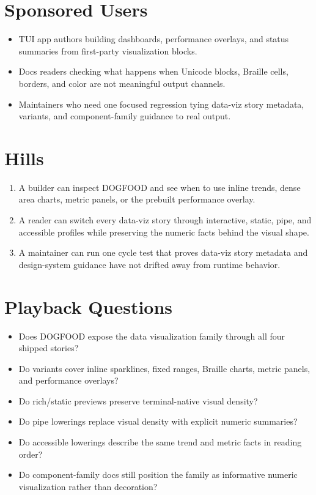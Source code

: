 \section{Sponsored Users}\label{record-107-sponsored-users}

\begin{itemize}
\tightlist
\item
  TUI app authors building dashboards, performance overlays, and status summaries from first-party visualization blocks.
\item
  Docs readers checking what happens when Unicode blocks, Braille cells, borders, and color are not meaningful output channels.
\item
  Maintainers who need one focused regression tying data-viz story metadata, variants, and component-family guidance to real output.
\end{itemize}

\section{Hills}\label{record-107-hills}

\begin{enumerate}
\def\labelenumi{\arabic{enumi}.}
\tightlist
\item
  A builder can inspect DOGFOOD and see when to use inline trends, dense area charts, metric panels, or the prebuilt performance overlay.
\item
  A reader can switch every data-viz story through interactive, static, pipe, and accessible profiles while preserving the numeric facts behind the visual shape.
\item
  A maintainer can run one cycle test that proves data-viz story metadata and design-system guidance have not drifted away from runtime behavior.
\end{enumerate}

\section{Playback Questions}\label{record-107-playback-questions}

\begin{itemize}
\tightlist
\item
  Does DOGFOOD expose the data visualization family through all four shipped stories?
\item
  Do variants cover inline sparklines, fixed ranges, Braille charts, metric panels, and performance overlays?
\item
  Do rich/static previews preserve terminal-native visual density?
\item
  Do pipe lowerings replace visual density with explicit numeric summaries?
\item
  Do accessible lowerings describe the same trend and metric facts in reading order?
\item
  Do component-family docs still position the family as informative numeric visualization rather than decoration?
\end{itemize}

